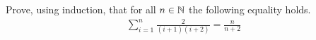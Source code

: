 \begin{question}
    \normalfont
    Prove, using induction, that for all $n\in\mathbb N$ the following equality holds.
    \[
        \begin{aligned}
            \sum_{i=1}^{n}\frac{2}{(i+1)(i+2)}=\frac{n}{n+2}
        \end{aligned}
    \]
\end{question}

